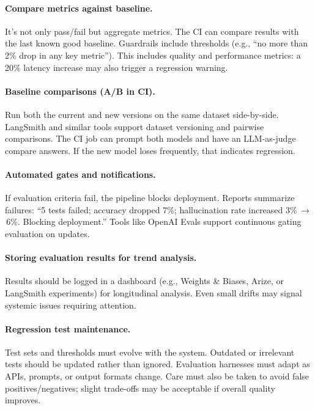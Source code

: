 \paragraph*{Compare metrics against baseline.}  
It’s not only pass/fail but aggregate metrics. The CI can compare results with the last known good baseline. Guardrails include thresholds (e.g., “no more than 2\% drop in any key metric”). This includes quality and performance metrics: a 20\% latency increase may also trigger a regression warning.

\paragraph*{Baseline comparisons (A/B in CI).}  
Run both the current and new versions on the same dataset side-by-side. LangSmith and similar tools support dataset versioning and pairwise comparisons. The CI job can prompt both models and have an LLM-as-judge compare answers. If the new model loses frequently, that indicates regression.

\paragraph*{Automated gates and notifications.}  
If evaluation criteria fail, the pipeline blocks deployment. Reports summarize failures: “5 tests failed; accuracy dropped 7\%; hallucination rate increased 3\%\,$\to$\,6\%. Blocking deployment.” Tools like OpenAI Evals support continuous gating evaluation on updates.

\paragraph*{Storing evaluation results for trend analysis.}  
Results should be logged in a dashboard (e.g., Weights \& Biases, Arize, or LangSmith experiments) for longitudinal analysis. Even small drifts may signal systemic issues requiring attention.

\paragraph*{Regression test maintenance.}  
Test sets and thresholds must evolve with the system. Outdated or irrelevant tests should be updated rather than ignored. Evaluation harnesses must adapt as APIs, prompts, or output formats change. Care must also be taken to avoid false positives/negatives; slight trade-offs may be acceptable if overall quality improves.

